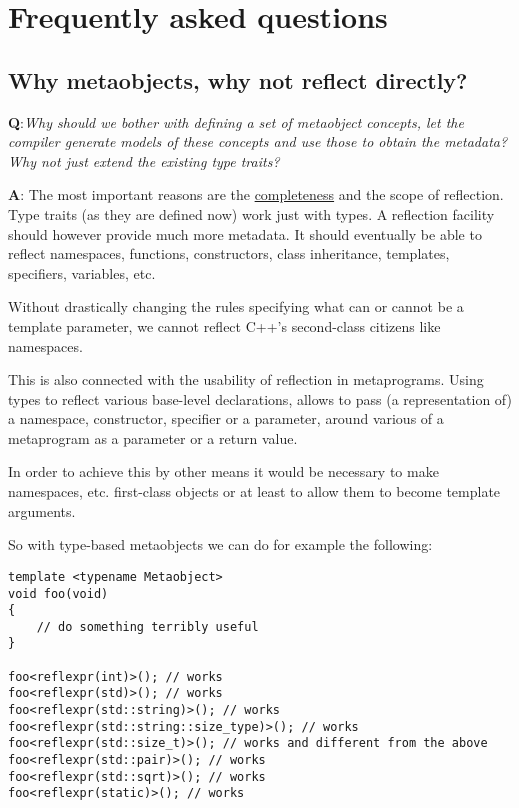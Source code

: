 \section{Frequently asked questions}

\subsection{Why metaobjects, why not reflect directly?}

{\textbf Q:}{\em Why should we bother with defining a set of metaobject concepts,
let the compiler generate models of these concepts and use those to obtain
the metadata? Why not just extend the existing type traits?}

{\textbf A:} The most important reasons are the \hyperref[design-completeness]{completeness}
and the scope of reflection.
Type traits (as they are defined now) work just with types. A reflection facility should
however provide much more metadata.
It should eventually be able to reflect namespaces, functions, constructors,
class inheritance, templates, specifiers, variables, etc.

Without drastically changing the rules specifying what can or cannot be a template
parameter, we cannot reflect C++'s second-class citizens like namespaces.

This is also connected with the usability of reflection in metaprograms.
Using types to reflect various base-level declarations, allows to
pass (a representation of) a namespace, constructor, specifier or a parameter,
around various  of a metaprogram as a parameter or a return value.

In order to achieve this by other means it would be necessary to make namespaces,
etc. first-class objects or at least to allow them to become template arguments.

So with type-based metaobjects we can do for example the following:

\begin{verbatim}
template <typename Metaobject>
void foo(void)
{
	// do something terribly useful
}

foo<reflexpr(int)>(); // works
foo<reflexpr(std)>(); // works
foo<reflexpr(std::string)>(); // works
foo<reflexpr(std::string::size_type)>(); // works
foo<reflexpr(std::size_t)>(); // works and different from the above
foo<reflexpr(std::pair)>(); // works
foo<reflexpr(std::sqrt)>(); // works
foo<reflexpr(static)>(); // works
\end{verbatim}

